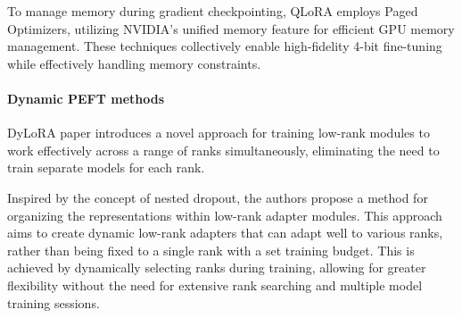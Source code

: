 \documentclass[11pt]{article}
\begin{document}
To manage memory during gradient checkpointing, QLoRA employs Paged Optimizers, utilizing NVIDIA's unified memory feature for efficient GPU memory management. These techniques collectively enable high-fidelity 4-bit fine-tuning while effectively handling memory constraints.




\paragraph{Dynamic PEFT methods}
DyLoRA paper \cite{valipour2022DyLoRA} introduces a novel approach for training low-rank modules to work effectively across a range of ranks simultaneously, eliminating the need to train separate models for each rank. 

Inspired by the concept of nested dropout, the authors propose a method for organizing the representations within low-rank adapter modules. This approach aims to create dynamic low-rank adapters that can adapt well to various ranks, rather than being fixed to a single rank with a set training budget. This is achieved by dynamically selecting ranks during training, allowing for greater flexibility without the need for extensive rank searching and multiple model training sessions.
\end{document}
